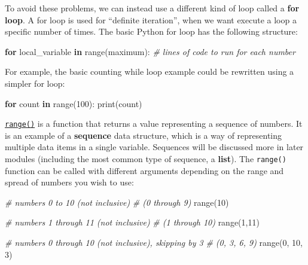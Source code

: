 \documentclass[]{book}
\newenvironment{Shaded}{\begin{snugshade}}{\end{snugshade}}
\newcommand{\KeywordTok}[1]{\textcolor[rgb]{0.13,0.29,0.53}{\textbf{#1}}}
\newcommand{\DecValTok}[1]{\textcolor[rgb]{0.00,0.00,0.81}{#1}}
\newcommand{\CommentTok}[1]{\textcolor[rgb]{0.56,0.35,0.01}{\textit{#1}}}
\newcommand{\ControlFlowTok}[1]{\textcolor[rgb]{0.13,0.29,0.53}{\textbf{#1}}}
\newcommand{\BuiltInTok}[1]{#1}
\newcommand{\NormalTok}[1]{#1}
\begin{document}
To avoid these problems, we can instead use a different kind of loop
called a \textbf{for loop}. A for loop is used for ``definite
iteration'', when we want execute a loop a specific number of times. The
basic Python for loop has the following structure:

\begin{Shaded}
\begin{Highlighting}[]
\ControlFlowTok{for}\NormalTok{ local_variable }\KeywordTok{in} \BuiltInTok{range}\NormalTok{(maximum):}
    \CommentTok{# lines of code to run for each number}
\end{Highlighting}
\end{Shaded}

For example, the basic counting while loop example could be rewritten
using a simpler for loop:

\begin{Shaded}
\begin{Highlighting}[]
\ControlFlowTok{for}\NormalTok{ count }\KeywordTok{in} \BuiltInTok{range}\NormalTok{(}\DecValTok{100}\NormalTok{):}
  \BuiltInTok{print}\NormalTok{(count)}
\end{Highlighting}
\end{Shaded}

\href{https://docs.python.org/3/library/stdtypes.html\#ranges}{\texttt{range()}}
is a function that returns a value representing a sequence of numbers.
It is an example of a \textbf{sequence} data structure, which is a way
of representing multiple data items in a single variable. Sequences will
be discussed more in later modules (including the most common type of
sequence, a \textbf{list}). The \texttt{range()} function can be called
with different arguments depending on the range and spread of numbers
you wish to use:

\begin{Shaded}
\begin{Highlighting}[]
\CommentTok{# numbers 0 to 10 (not inclusive)}
\CommentTok{# (0 through 9)}
\BuiltInTok{range}\NormalTok{(}\DecValTok{10}\NormalTok{)}

\CommentTok{# numbers 1 through 11 (not inclusive)}
\CommentTok{# (1 through 10)}
\BuiltInTok{range}\NormalTok{(}\DecValTok{1}\NormalTok{,}\DecValTok{11}\NormalTok{)}

\CommentTok{# numbers 0 through 10 (not inclusive), skipping by 3}
\CommentTok{# (0, 3, 6, 9)}
\BuiltInTok{range}\NormalTok{(}\DecValTok{0}\NormalTok{, }\DecValTok{10}\NormalTok{, }\DecValTok{3}\NormalTok{)}
\end{Highlighting}
\end{Shaded}
\end{document}
